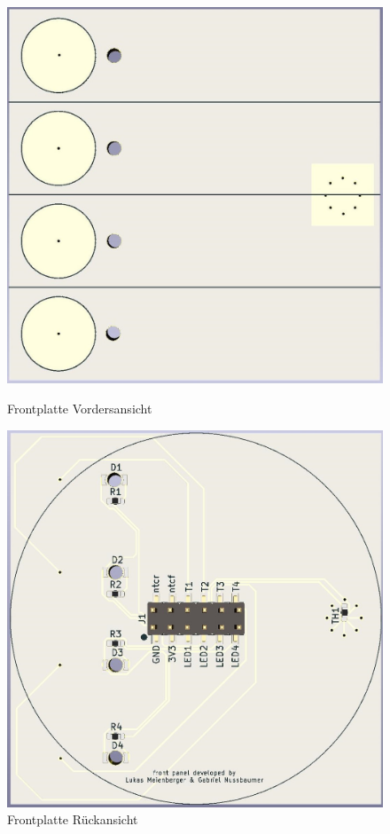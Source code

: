 \begin{figure}[h!]
	\centering
	\begin{minipage}[t]{0.4\linewidth}
	\centering
	\includegraphics[width=1\textwidth]{graphics/Frontplatte_vorne.jpg}
	\caption{Frontplatte Vordersansicht}
	\label{pic: Frontplatte_vorne}
	\end{minipage}%
	\hfill
	\begin{minipage}[t]{0.4\linewidth}
	\centering
	\includegraphics[width=1\textwidth]{graphics/Frontplatte_hinten.jpg}
	\caption{Frontplatte Rückansicht}
	\label{pic: Frontplatte_hinten}
	\end{minipage}
\end{figure}

